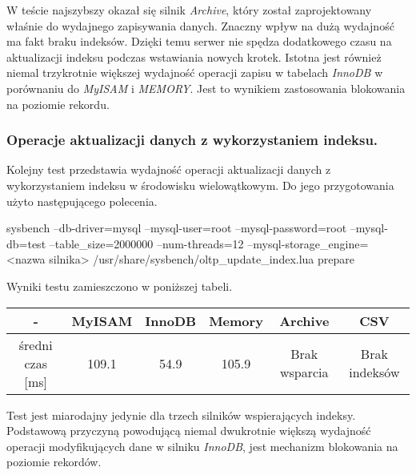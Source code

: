 W teście najszybszy okazał się silnik \textit{Archive}, który został zaprojektowany właśnie do wydajnego zapisywania danych. Znaczny wpływ na dużą wydajność ma fakt braku indeksów. Dzięki temu serwer nie spędza dodatkowego czasu na aktualizacji indeksu podczas wstawiania nowych krotek. Istotna jest również niemal trzykrotnie większej wydajność operacji zapisu w tabelach \textit{InnoDB} w porównaniu do \textit{MyISAM} i \textit{MEMORY}. Jest to wynikiem zastosowania blokowania na poziomie rekordu.

\subsubsection{Operacje aktualizacji danych z wykorzystaniem indeksu.}

Kolejny test przedstawia wydajność operacji aktualizacji danych z wykorzystaniem indeksu w środowisku wielowątkowym. Do jego przygotowania użyto następującego polecenia.
\begin{spverbatim}
	sysbench --db-driver=mysql --mysql-user=root --mysql-password=root --mysql-db=test --table_size=2000000 --num-threads=12 --mysql-storage_engine=
	<nazwa silnika> /usr/share/sysbench/oltp_update_index.lua prepare
\end{spverbatim}

Wyniki testu zamieszczono w poniższej tabeli.
\begin{center}
	\begin{tabular}{ | c | c | c | c | c | c |}
		\hline
		- & MyISAM & InnoDB & Memory & Archive & CSV  \\ 
		\hline
		średni czas [ms] & 109.1 & 54.9 & 105.9 & Brak wsparcia & Brak indeksów \\
		\hline
	\end{tabular}
\end{center}

Test jest miarodajny jedynie dla trzech silników wspierających indeksy. Podstawową przyczyną powodującą niemal dwukrotnie większą wydajność operacji modyfikujących dane w silniku \textit{InnoDB}, jest mechanizm blokowania na poziomie rekordów.

